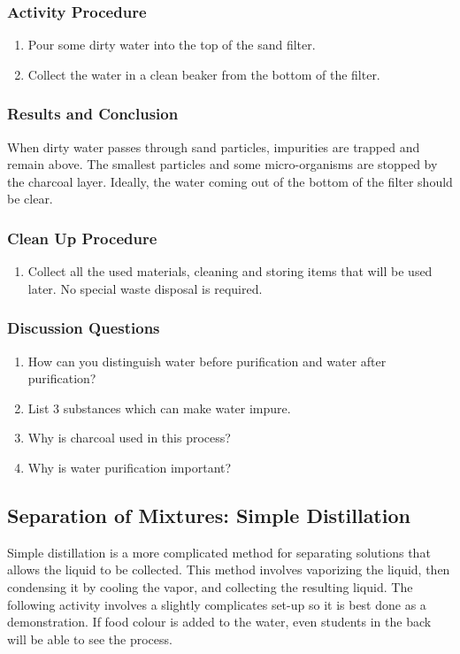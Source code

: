 \subsubsection*{Activity Procedure}
\begin{enumerate}
\item{Pour some dirty water into the top of the sand filter.}
\item{Collect the water in a clean beaker from the bottom of the filter.}
\end{enumerate}

\subsubsection*{Results and Conclusion}
When dirty water passes through sand particles, impurities are trapped and remain above. The smallest particles and some micro-organisms are stopped by the charcoal layer. Ideally, the water coming out of the bottom of the filter should be clear. 

\subsubsection*{Clean Up Procedure}
\begin{enumerate}
\item{Collect all the used materials, cleaning and storing items that will be used later. No special waste disposal is required.}
\end{enumerate}

\subsubsection*{Discussion Questions}
\begin{enumerate}
\item{How can you distinguish water before purification and water after purification?}
\item{List 3 substances which can make water impure.}
\item{Why is charcoal used in this process?}
\item{Why is water purification important?}
\end{enumerate}



\subsection{Separation of Mixtures: Simple Distillation}
Simple distillation is a more complicated method for separating solutions that allows the liquid to be collected. This method involves vaporizing the liquid, then condensing it by cooling the vapor, and collecting the resulting liquid.  The following activity involves a slightly complicates set-up so it is best done as a demonstration. If food colour is added to the water, even students in the back will be able to see the process.
